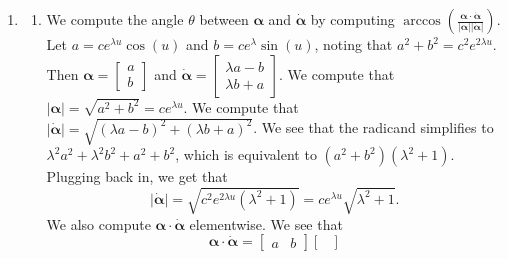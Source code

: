 \documentclass[12pt]{article}
\begin{document}
\begin{enumerate}[label=\Alph*.]
\begin{enumerate}[label=\theenumi\Alph*]
\begin{equation*}
            \vert\bm{\dot{\alpha}}\vert = \sqrt{a^2\cos^2(\pi k)} = a.
        \end{equation*} Similarly, at $\pi k+ \frac{\pi}{2}$, the speed is \begin{equation*}
            \vert\bm{\dot{\alpha}}\vert = \sqrt{b^2\sin^2(\pi k + \frac{\pi}{2})}=b.
        \end{equation*} By assumption, $a>b$, and therefore the speed is maximized at all points $\pi k$ and minimized at all points $\pi k + \frac{\pi}{2}$ for $k \in \mathbb{Z}$.
        \item No. The parameterization $u$ does not need to be related to $t$, and therefore B.A only tells us the speed relative the $u$, not the actual time $t$.
    \end{enumerate}
    \item \begin{enumerate}[label=\theenumi\Alph*]
        \item We compute the angle $\theta$ between $\bm{\alpha}$ and $\bm{\dot{\alpha}}$ by computing $\arccos(\frac{\bm{\alpha} \cdot \bm{\dot{\alpha}}}{\vert \bm{\alpha}\vert \vert \bm{\dot{\alpha}} \vert})$. Let $a=ce^{\lambda u}\cos(u)$ and $b=ce^{\lambda}\sin(u)$, noting that $a^2+b^2=c^2e^{2\lambda u}$. Then $\bm{\alpha}=\begin{bmatrix}
        a\\
        b
        \end{bmatrix}$ and
        $\bm{\dot{\alpha}}=\begin{bmatrix}
            \lambda a - b\\
            \lambda b + a
        \end{bmatrix}$. We compute that $\vert\bm{\alpha}\vert=\sqrt{a^2+b^2}=ce^{\lambda u}$. We compute that $\vert \bm{\dot{\alpha}} \vert=\sqrt{(\lambda a -b)^2 + (\lambda b + a)^2}$. We see that the radicand simplifies to
        $\lambda^2a^2 + \lambda^2b^2 + a^2 + b^2$, which is equivalent to $(a^2+b^2)(\lambda^2 + 1)$. Plugging back in, we get that \begin{equation*}
            \vert \bm{\dot{\alpha}} \vert = \sqrt{c^2e^{2\lambda u}(\lambda^2 + 1)}=ce^{\lambda u}\sqrt{\lambda^2 + 1}.
        \end{equation*} We also compute $\bm{\alpha}\cdot \bm{\dot{\alpha}}$ elementwise. We see that \begin{equation*}
            \bm{\alpha}\cdot\bm{\dot{\alpha}} = \begin{bmatrix}
            a & b
            \end{bmatrix}\begin{bmatrix}

\end{bmatrix}
\end{equation*}
\end{enumerate}
\end{enumerate}
\end{document}
